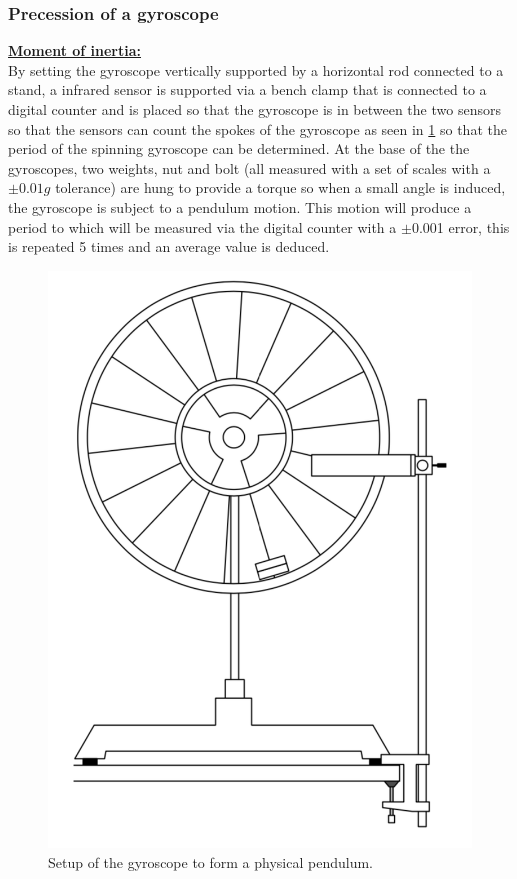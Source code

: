 \documentclass[12pt]{article}
\begin{document}
\subsubsection{Precession of a gyroscope}
\label{Precession of a gyroscope method}

\textbf{\underline{Moment of inertia:}} \\

By setting the gyroscope vertically supported by a horizontal rod connected to a stand, a infrared sensor is supported via a bench clamp that is connected to a digital counter and is placed so that the gyroscope is in between the two sensors so that the sensors can count the spokes of the gyroscope as seen in \cref{2.1 Moment of Inertia Setup} so that the period of the spinning gyroscope can be determined. At the base of the the gyroscopes, two weights, nut and bolt (all measured with a set of scales with a $\pm0.01g$ tolerance) are hung to provide a torque so when a small angle is induced, the gyroscope is subject to a pendulum motion. This motion will produce a period to which will be measured via the digital counter with a $\pm$0.001 error, this is repeated 5 times and an average value is deduced. \\

\begin{figure}[H]
\centering
\includegraphics[scale=0.5]{Images/Labscript/21_Moment_Of_Inertia.png}
\caption{Setup of the gyroscope to form a physical pendulum. \cite{Exp.4-2019}}
\label{2.1 Moment of Inertia Setup}
\end{figure} 
\end{document}
